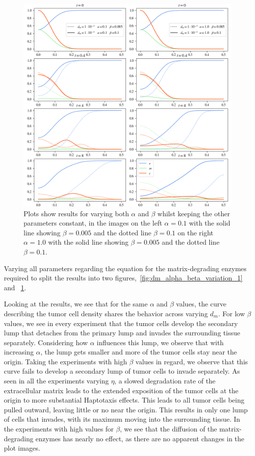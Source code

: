 \begin{figure}[h!]
    \centering
    \includegraphics[width=\textwidth]{resources/images/dm_alpha_beta_variation_2.png}
    \caption{Plots show results for varying both $\alpha$ and $\beta$ whilst keeping the other parameters constant, in the images on the left $\alpha=0.1$ with the solid line showing $\beta = 0.005$ and the dotted line $\beta=0.1$ on the right $\alpha=1.0$ with the solid line showing $\beta = 0.005$ and the dotted line $\beta=0.1$.}
    \label{fig:dm_alpha_beta_variation_2}
\end{figure}

Varying all parameters regarding the equation for the matrix-degrading enzymes required to split the results into two figures,~\ref{fig:dm_alpha_beta_variation_1} and ~\ref{fig:dm_alpha_beta_variation_2}.

Looking at the results, we see that for the same $\alpha$ and $\beta$ values, the curve describing the tumor cell density shares the behavior across varying $d_m$. For low $\beta$ values, we see in every experiment that the tumor cells develop the secondary lump that detaches from the primary lump and invades the surrounding tissue separately. Considering how $\alpha$ influences this lump, we observe that with increasing $\alpha$, the lump gets smaller and more of the tumor cells stay near the origin. Taking the experiments with high $\beta$ values in regard, we observe that this curve fails to develop a secondary lump of tumor cells to invade separately. As seen in all the experiments varying $\eta$, a slowed degradation rate of the extracellular matrix leads to the extended exposition of the tumor cells at the origin to more substantial Haptotaxis effects. This leads to all tumor cells being pulled outward, leaving little or no near the origin. This results in only one lump of cells that invades, with its maximum moving into the surrounding tissue. In the experiments with high values for $\beta$, we see that the diffusion of the matrix-degrading enzymes has nearly no effect, as there are no apparent changes in the plot images.

